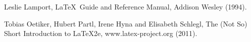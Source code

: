 \documentclass[a4paper,12pt]{article}
\begin{document}
\begin{thebibliography}{99}
 Leslie Lamport, \LaTeX\ Guide and Reference Manual, 
Addison Wesley (1994).

 Tobias Oetiker, Hubert Partl, Irene Hyna and Elisabeth Schlegl,
The (Not So) Short Introduction to \LaTeX 2e, www.latex-project.org (2011).
 
\end{thebibliography} 
\end{document}
